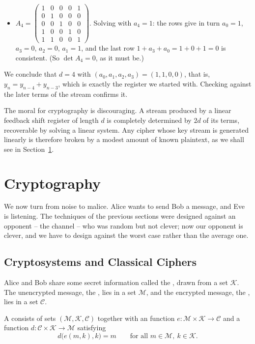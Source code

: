 \documentclass[a4paper]{scrartcl}
\newcommand{\Cc}{\mathcal{C}}
\newcommand{\Kc}{\mathcal{K}}
\newcommand{\Mc}{\mathcal{M}}
\begin{document}
\begin{example}
\begin{itemize}
		\item $A_4 = \begin{pmatrix}1&0&0&0&1\\0&1&0&0&0\\0&0&1&0&0\\1&0&0&1&0\\1&1&0&0&1\end{pmatrix}$. Solving with $a_4=1$: the rows give in turn $a_0 = 1$, $a_3 = 0$, $a_2 = 0$, $a_1 = 1$, and the last row $1+a_3+a_0 = 1+0+1 = 0$ is consistent. (So $\det A_4 = 0$, as it must be.)
	\end{itemize}
	We conclude that $d = 4$ with $(a_0,a_1,a_2,a_3) = (1,1,0,0)$, that is, $y_n = y_{n-4}+y_{n-3}$, which is exactly the register we started with. Checking against the later terms of the stream confirms it.
\end{example}

\begin{remark}
	The moral for cryptography is discouraging. A stream produced by a linear feedback shift register of length $d$ is completely determined by $2d$ of its terms, recoverable by solving a linear system. Any cipher whose key stream is generated linearly is therefore broken by a modest amount of known plaintext, as we shall see in Section~\ref{cc-sec:crypto}.
\end{remark}


\section{Cryptography}\label{cc-sec:crypto}

We now turn from noise to malice. Alice wants to send Bob a message, and Eve is listening. The techniques of the previous sections were designed against an opponent -- the channel -- who was random but not clever; now our opponent is clever, and we have to design against the worst case rather than the average one.

\subsection{Cryptosystems and Classical Ciphers}

Alice and Bob share some secret information called the , drawn from a set $\Kc$. The unencrypted message, the , lies in a set $\Mc$, and the encrypted message, the , lies in a set $\Cc$.

\begin{definition}[Cryptosystem]
	A  consists of sets $(\Mc,\Kc,\Cc)$ together with an  function $e\colon\Mc\times\Kc\to\Cc$ and a  function $d\colon\Cc\times\Kc\to\Mc$ satisfying
	$$d\bigl(e(m,k),k\bigr) = m \qquad \text{for all } m \in \Mc,\ k \in \Kc.$$
\end{definition}
\end{document}
